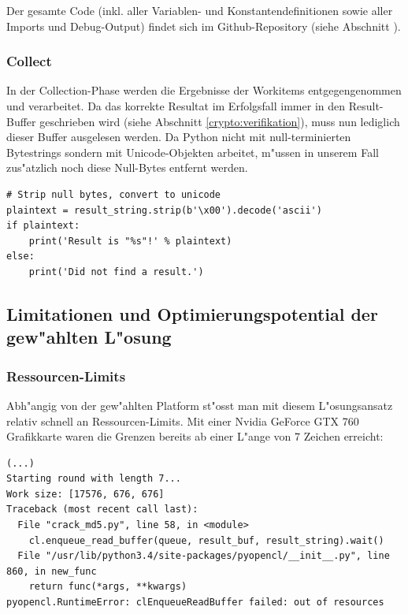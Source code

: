 \begin{refsection}
\noindent Der gesamte Code (inkl. aller Variablen- und Konstantendefinitionen
sowie aller Imports und Debug-Output) findet sich im Github-Repository (siehe
Abschnitt \cite{crypto:resultate:links}).

\subsubsection{Collect}

In der Collection-Phase werden die Ergebnisse der Workitems entgegengenommen und
verarbeitet. Da das korrekte Resultat im Erfolgsfall immer in den Result-Buffer
geschrieben wird (siehe Abschnitt \ref{crypto:verifikation}), muss nun lediglich
dieser Buffer ausgelesen werden. Da Python nicht mit null-terminierten
Bytestrings sondern mit Unicode-Objekten arbeitet, m"ussen in unserem Fall
zus"atzlich noch diese Null-Bytes entfernt werden.

\begin{small}
\begin{verbatim}
# Strip null bytes, convert to unicode
plaintext = result_string.strip(b'\x00').decode('ascii')
if plaintext:
    print('Result is "%s"!' % plaintext)
else:
    print('Did not find a result.')
\end{verbatim}
\end{small}


\subsection{Limitationen und Optimierungspotential der gew"ahlten L"osung}

\subsubsection{Ressourcen-Limits}
\label{crypto:resourcenlimits}

Abh"angig von der gew"ahlten Platform st"osst man mit diesem L"osungsansatz
relativ schnell an Ressourcen-Limits. Mit einer Nvidia GeForce GTX 760
Grafikkarte waren die Grenzen bereits ab einer L"ange von 7 Zeichen erreicht:

\begin{small}
\begin{verbatim}
(...)
Starting round with length 7...
Work size: [17576, 676, 676]
Traceback (most recent call last):
  File "crack_md5.py", line 58, in <module>
    cl.enqueue_read_buffer(queue, result_buf, result_string).wait()
  File "/usr/lib/python3.4/site-packages/pyopencl/__init__.py", line 860, in new_func
    return func(*args, **kwargs)
pyopencl.RuntimeError: clEnqueueReadBuffer failed: out of resources
\end{verbatim}
\end{small}


\end{refsection}
